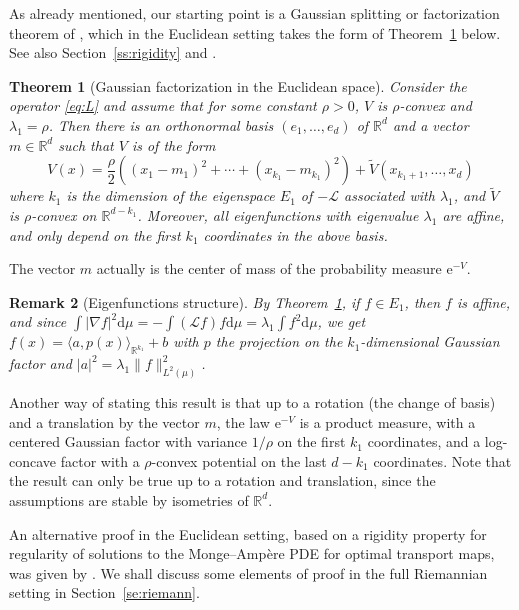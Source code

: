 \documentclass[10pt,reqno]{amsart}
\newtheorem{theorem}{Theorem}[section]
\newtheorem{remark}[theorem]{Remark}
\numberwithin{equation}{section}
\begin{document}
As already mentioned, our starting point is a Gaussian splitting or
factorization theorem of \cite{CZ17}, which in the Euclidean setting takes the
form of Theorem~\ref{thm_split_eucl} below. See also Section~\ref{ss:rigidity}
and \cite[Rem.~3.2]{MR4175749}.

\begin{theorem}[Gaussian factorization in the Euclidean
  space] \label{thm_split_eucl} Consider the operator \eqref{eq:L} and assume
  that for some constant $\rho>0$, $V$ is $\rho$-convex and
  $\lambda_1 = \rho$. Then there is an orthonormal basis $(e_1,\ldots,e_d)$ of
  $\mathbb{R}^d$ and a vector $m \in \mathbb{R}^d$ such that $V$ is of the form
    \begin{equation}
    V(x) = \frac{\rho}{2}((x_1-m_1)^2 + \cdots + (x_{k_1}-m_{k_1})^2) + \widetilde{V}(x_{k_1+1},\ldots,x_d)
  \end{equation}
  where $k_1$ is the dimension of the eigenspace $E_1$ of $-\mathcal{L}$
  associated with $\lambda_1$, and $\widetilde{V}$ is $\rho$-convex on
  $\mathbb{R}^{d-k_1}$. Moreover, all eigenfunctions with eigenvalue
  $\lambda_1$ are affine, and only depend on the first $k_1$ coordinates in
  the above basis.
\end{theorem}

The vector $m$ actually is the center of mass of the probability measure $\mathrm{e}^{-V}$. 

\begin{remark}[Eigenfunctions structure] \label{rem_eigen_grad} By
  Theorem~\ref{thm_split_eucl}, if $f\in E_1$, then $f$ is affine, and since
  $\int |\nabla f|^2\mathrm{d}\mu = -\int (\mathcal{L} f)f\mathrm{d}\mu
  =\lambda_1\int f^2\mathrm{d}\mu$, we get
  $f(x)=\langle a, p(x)\rangle_{\mathbb{R}^{k_1}} + b$ with $p$ the projection
  on the $k_1$-dimensional Gaussian factor and
  $|a|^2 = \lambda_1\|f\|_{L^2(\mu)}^2$.
\end{remark}

Another way of stating this result is that up to a rotation (the change of
basis) and a translation by the vector $m$, the law $\mathrm{e}^{-V}$ is a
product measure, with a centered Gaussian factor with variance $1/\rho$ on the
first $k_1$ coordinates, and a log-concave factor with a $\rho$-convex
potential on the last $d-k_1$ coordinates. Note that the result can only be
true up to a rotation and translation, since the assumptions are stable by
isometries of $\mathbb{R}^d$.

An alternative proof in the Euclidean setting, based on a rigidity property
for regularity of solutions to the Monge--Ampère PDE for optimal transport
maps, was given by \cite{DPF17}. We shall discuss some elements of proof in
the full Riemannian setting in Section~\ref{se:riemann}.
\end{document}
